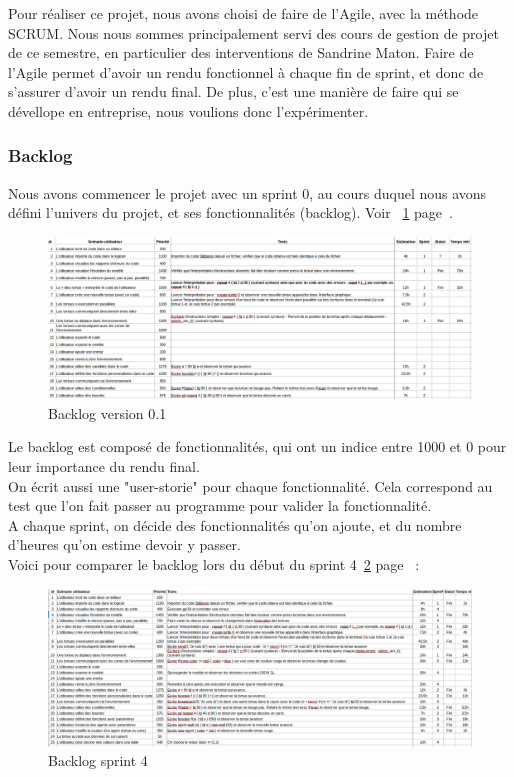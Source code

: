 Pour réaliser ce projet, nous avons choisi de faire de l'Agile, avec la méthode SCRUM. Nous nous sommes principalement servi des cours de gestion de projet de ce semestre, en particulier des interventions de Sandrine Maton. Faire de l'Agile permet d'avoir un rendu fonctionnel à chaque fin de sprint, et donc de s'assurer d'avoir un rendu final. De plus, c'est une manière de faire qui se dévellope en entreprise, nous voulions donc l'expérimenter.
\subsubsection{Backlog}
Nous avons commencer le projet avec un sprint 0, au cours duquel nous avons défini l'univers du projet, et ses fonctionnalités (backlog). Voir ~\ref{backlogv1} page~\pageref{backlogv1}.\\
\begin{figure}[h]
\caption{\label{backlogv1} Backlog version 0.1}
\includegraphics[scale=0.35]{doc/report/uml/backlogv1.png}
\end{figure}
Le backlog est composé de fonctionnalités, qui ont un indice entre 1000 et 0 pour leur importance du rendu final.\\ On écrit aussi une "user-storie" pour chaque fonctionnalité. Cela correspond au test que l'on fait passer au programme pour valider la fonctionnalité.\\
A chaque sprint, on décide des fonctionnalités qu'on ajoute, et du nombre d'heures qu'on estime devoir y passer.\\
Voici pour comparer le backlog lors du début du sprint 4~\ref{backlogsp4} page~\pageref{backlogsp4} :\\
\begin{figure}[h]
\caption{\label{backlogsp4} Backlog sprint 4}
\includegraphics[scale=0.35]{doc/report/uml/backlogsp4.png}
\end{figure}
